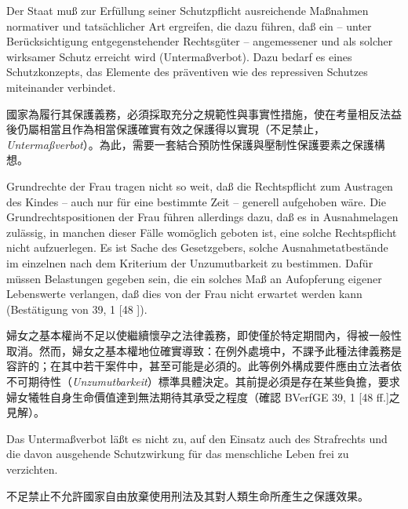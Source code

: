 \documentclass[12pt]{article}
\begin{document}
\syncleft
\begin{sourcepara}[title={原文要旨 6}]
Der Staat muß zur Erfüllung seiner Schutzpflicht ausreichende Maßnahmen normativer und tatsächlicher Art ergreifen, die dazu führen, daß ein -- unter Berücksichtigung entgegenstehender Rechtsgüter -- angemessener und als solcher wirksamer Schutz erreicht wird (Untermaßverbot). Dazu bedarf es eines Schutzkonzepts, das Elemente des präventiven wie des repressiven Schutzes miteinander verbindet.
\end{sourcepara}
\begin{transpara}
國家為履行其保護義務，必須採取充分之規範性與事實性措施，使在考量相反法益後仍屬相當且作為相當保護確實有效之保護得以實現（不足禁止，\textit{Untermaßverbot}）。為此，需要一套結合預防性保護與壓制性保護要素之保護構想。
\end{transpara}

\syncleft
\begin{sourcepara}[title={原文要旨 7}]
Grundrechte der Frau tragen nicht so weit, daß die Rechtspflicht zum Austragen des Kindes -- auch nur für eine bestimmte Zeit -- generell aufgehoben wäre. Die Grundrechtspositionen der Frau führen allerdings dazu, daß es in Ausnahmelagen zulässig, in manchen dieser Fälle womöglich geboten ist, eine solche Rechtspflicht nicht aufzuerlegen. Es ist Sache des Gesetzgebers, solche Ausnahmetatbestände im einzelnen nach dem Kriterium der Unzumutbarkeit zu bestimmen. Dafür müssen Belastungen gegeben sein, die ein solches Maß an Aufopferung eigener Lebenswerte verlangen, daß dies von der Frau nicht erwartet werden kann (Bestätigung von \abbrBVerfGE{} 39, 1 [48 \abbrFF{}]).
\end{sourcepara}
\begin{transpara}
婦女之基本權尚不足以使繼續懷孕之法律義務，即使僅於特定期間內，得被一般性取消。然而，婦女之基本權地位確實導致：在例外處境中，不課予此種法律義務是容許的；在其中若干案件中，甚至可能是必須的。此等例外構成要件應由立法者依不可期待性（\textit{Unzumutbarkeit}）標準具體決定。其前提必須是存在某些負擔，要求婦女犧牲自身生命價值達到無法期待其承受之程度（確認 BVerfGE 39, 1 [48 ff.]之見解）。
\end{transpara}

\syncleft
\begin{sourcepara}[title={原文要旨 8}]
Das Untermaßverbot läßt es nicht zu, auf den Einsatz auch des Strafrechts und die davon ausgehende Schutzwirkung für das menschliche Leben frei zu verzichten.
\end{sourcepara}
\begin{transpara}
不足禁止不允許國家自由放棄使用刑法及其對人類生命所產生之保護效果。
\end{transpara}
\end{document}
